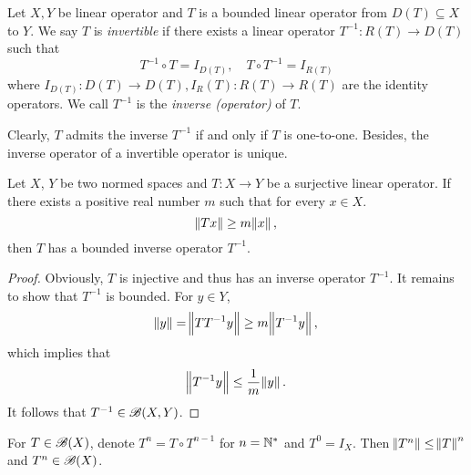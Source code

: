 \begin{defn}
Let $X, Y$ be linear operator and $T$ is a bounded linear operator from 
$D(T) \subseteq X$ to $Y$. 
We say $T$ is \emph{invertible} if there exists a linear operator 
$T^{-1}: R(T) \to D(T)$ such that 
\begin{equation*}
    T^{-1} \circ T = I_{D(T)}, \quad 
    T \circ T^{-1} = I_{R(T)}
\end{equation*}
where $I_{D(T)}: D(T) \to D(T), I_R(T): R(T) \to R(T)$ are the identity 
operators. 
We call $T^{-1}$ is the \emph{inverse (operator)} of $T$. 
\end{defn}

Clearly, $T$ admits the inverse $T ^{-1}$ if and only if $T$ is one-to-one.
Besides, the inverse operator of a invertible operator is unique. 

\begin{thm}
Let $X$, $Y$ be two normed spaces and $T: X \to Y$ be a surjective linear 
operator. 
If there exists a positive real number $m$ such that for every 
$x \in X$. 
\begin{equation*}
    \norm{Tx} \ge m \norm{x}, 
\end{equation*}
then $T$ has a bounded inverse operator $T^{-1}$. 
\end{thm}
\begin{proof}
Obviously, $T$ is injective and thus has an inverse operator $T^{-1}$. 
It remains to show that $T^{-1}$ is bounded. 
For $y \in Y$, 
\begin{equation*}
    \norm{y} = \norm{T T^{-1} y} \ge m \norm{T^{-1} y}, 
\end{equation*}
which implies that 
\begin{equation*}
    \norm{T^{-1} y} \le \frac{1}{m} \norm{y}. 
\end{equation*}
It follows that $T^{-1} \in \mathscr{B}(X, Y)$. 
\end{proof}

For $T \in \mathscr{B}(X)$, denote $T^n = T \circ T^{n-1}$ for $n = \mathbb{N}^\ast$ and 
$T^0 = I_X$. 
Then $\norm{T^n} \le \norm{T}^n$ and $T^n \in \mathscr{B}(X)$. 

